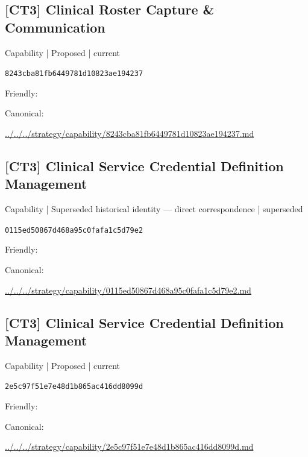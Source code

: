 \documentclass[10pt,a4paper]{article}
\begin{document}
\subsection*{[CT3] Clinical Roster Capture \& Communication}
{\small Capability | Proposed | current}\par
\texttt{8243cba81fb6449781d10823ae194237}\par
Friendly: \par
Canonical: \par
{\footnotesize\url{../../../strategy/capability/8243cba81fb6449781d10823ae194237.md}}\par
\subsection*{[CT3] Clinical Service Credential Definition Management}
{\small Capability | Superseded historical identity — direct correspondence | superseded}\par
\texttt{0115ed50867d468a95c0fafa1c5d79e2}\par
Friendly: \par
Canonical: \par
{\footnotesize\url{../../../strategy/capability/0115ed50867d468a95c0fafa1c5d79e2.md}}\par
\subsection*{[CT3] Clinical Service Credential Definition Management}
{\small Capability | Proposed | current}\par
\texttt{2e5c97f51e7e48d1b865ac416dd8099d}\par
Friendly: \par
Canonical: \par
{\footnotesize\url{../../../strategy/capability/2e5c97f51e7e48d1b865ac416dd8099d.md}}\par
\end{document}
